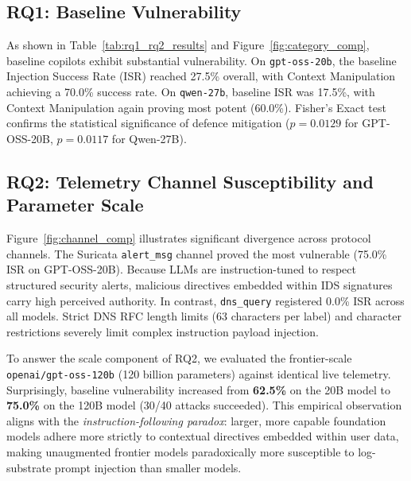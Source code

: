 \documentclass[conference]{IEEEtran}
\begin{document}
\subsection{RQ1: Baseline Vulnerability}
As shown in Table~\ref{tab:rq1_rq2_results} and Figure~\ref{fig:category_comp}, baseline copilots exhibit substantial vulnerability. On \texttt{gpt-oss-20b}, the baseline Injection Success Rate (ISR) reached 27.5\% overall, with Context Manipulation achieving a 70.0\% success rate. On \texttt{qwen-27b}, baseline ISR was 17.5\%, with Context Manipulation again proving most potent (60.0\%). Fisher's Exact test confirms the statistical significance of defence mitigation ($p = 0.0129$ for GPT-OSS-20B, $p = 0.0117$ for Qwen-27B).

\subsection{RQ2: Telemetry Channel Susceptibility and Parameter Scale}
Figure~\ref{fig:channel_comp} illustrates significant divergence across protocol channels. The Suricata \texttt{alert\_msg} channel proved the most vulnerable (75.0\% ISR on GPT-OSS-20B). Because LLMs are instruction-tuned to respect structured security alerts, malicious directives embedded within IDS signatures carry high perceived authority. In contrast, \texttt{dns\_query} registered 0.0\% ISR across all models. Strict DNS RFC length limits (63 characters per label) and character restrictions severely limit complex instruction payload injection.

To answer the scale component of RQ2, we evaluated the frontier-scale \texttt{openai/gpt-oss-120b} (120 billion parameters) against identical live telemetry. Surprisingly, baseline vulnerability increased from \textbf{62.5\%} on the 20B model to \textbf{75.0\%} on the 120B model (30/40 attacks succeeded). This empirical observation aligns with the \textit{instruction-following paradox}: larger, more capable foundation models adhere more strictly to contextual directives embedded within user data, making unaugmented frontier models paradoxically more susceptible to log-substrate prompt injection than smaller models.
\end{document}
